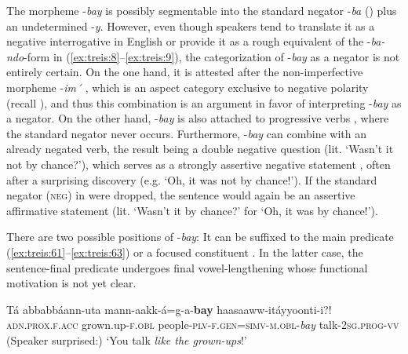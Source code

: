 \documentclass[output=paper,colorlinks,citecolor=brown,draftmode
]{langscibook}
\begin{document}
The morpheme -\textit{bay} is possibly segmentable into the standard negator -\textit{ba} () plus an undetermined -\textit{y}. However, even though speakers tend to translate it as a negative interrogative in English or provide it as a rough equivalent of the -\textit{ba-ndo}-form in (\ref{ex:treis:8}--\ref{ex:treis:9}), the categorization of -\textit{bay} as a negator is not entirely certain. On the one hand, it is attested after the non-imperfective morpheme -\textit{im´} , which is an aspect category exclusive to negative polarity (recall ), and thus this combination is an argument in favor of interpreting -\textit{bay} as a negator. On the other hand, -\textit{bay} is also attached to progressive verbs , where the standard negator never occurs. Furthermore, -\textit{bay} can combine with an already negated verb, the result being a double negative question (lit. ‘Wasn’t it not by chance?’), which serves as a strongly assertive negative statement , often after a surprising discovery (e.g. ‘Oh, it was not by chance!’). If the standard negator (\textsc{neg}) in  were dropped, the sentence would again be an assertive affirmative statement (lit. ‘Wasn’t it by chance?’ for ‘Oh, it was by chance!’).


There are two possible positions of -\textit{bay}: It can be suffixed to the main predicate (\ref{ex:treis:61}--\ref{ex:treis:63}) or a focused constituent . In the latter case, the sentence-final predicate undergoes final vowel-lengthening whose functional motivation is not yet clear.

\ea\label{ex:treis:64} 
\gll Tá	abbabbáann-uta	mann-aakk-á=g-a-\textbf{bay} haasaaww-itáyyoonti-i?!\\
	\textsc{\textsc{adn}.prox.f.acc}	grown.up-\textsc{f.obl}	people-\textsc{plv-f.gen=simv-m.obl}-\textit{bay} talk-\textsc{2sg.prog-vv}\\
\glt (Speaker surprised:) ‘You talk \textit{like the grown-ups}!’  \citep[28]{Saint-Exupéry2018}
\z 
\end{document}

